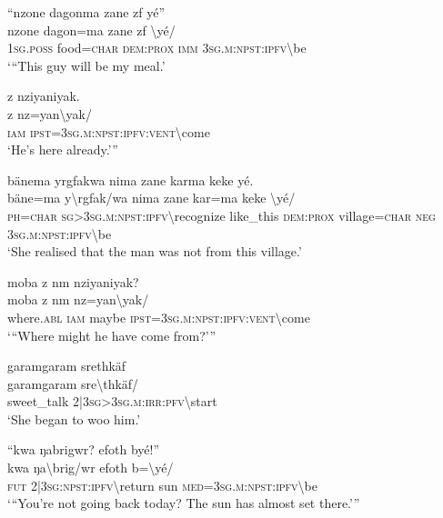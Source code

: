\ea\label{ex:7:a4740}
``nzone dagonma zane zf yé''\\
\gll nzone	dagon=ma	zane	zf	{\textbackslash}yé/\\
     1\textsc{sg}.\textsc{poss}	food=\textsc{char}	\textsc{dem}:\textsc{prox}	\textsc{imm}	3\textsc{sg}.\textsc{m}:\textsc{npst}:\textsc{ipfv}{\textbackslash}be\\
\glt `{``}This guy will be my meal.'
\z

\ea\label{ex:7:a4741}
z nziyaniyak.\\
\gll z	nz=yan{\textbackslash}yak/\\
     \textsc{iam}	\textsc{ipst}=3\textsc{sg}.\textsc{m}:\textsc{npst}:\textsc{ipfv}:\textsc{vent}{\textbackslash}come\\
\glt `He's here already.'''
\z

\ea\label{ex:7:a4742}
bänema yrgfakwa nima zane karma keke yé.\\
\gll bäne=ma	y{\textbackslash}rgfak/wa	nima	zane	kar=ma	keke	{\textbackslash}yé/\\
     \textsc{ph}=\textsc{char}	\textsc{sg}>3\textsc{sg}.\textsc{m}:\textsc{npst}:\textsc{ipfv}{\textbackslash}recognize	like\_this	\textsc{dem}:\textsc{prox}	village=\textsc{char}	\textsc{neg}	3\textsc{sg}.\textsc{m}:\textsc{npst}:\textsc{ipfv}{\textbackslash}be\\
\glt `She realised that the man was not from this village.'
\z

\ea\label{ex:7:a4743}
moba z nm nziyaniyak?\\
\gll moba	z	nm	nz=yan{\textbackslash}yak/\\
     where.\textsc{abl}	\textsc{iam}	maybe	\textsc{ipst}=3\textsc{sg}.\textsc{m}:\textsc{npst}:\textsc{ipfv}:\textsc{vent}{\textbackslash}come\\
\glt `{``}Where might he have come from?'''
\z

\ea\label{ex:7:a4744}
garamgaram srethkäf\\
\gll garamgaram	sre{\textbackslash}thkäf/\\
     sweet\_talk	2|3\textsc{sg}>3\textsc{sg}.\textsc{m}:\textsc{irr}:\textsc{pfv}{\textbackslash}start\\
\glt `She began to woo him.'
\z

\ea\label{ex:7:a4745}
``kwa ŋabrigwr? efoth byé!''\\
\gll kwa	ŋa{\textbackslash}brig/wr	efoth	b={\textbackslash}yé/\\
     \textsc{fut}	2|3\textsc{sg}:\textsc{npst}:\textsc{ipfv}{\textbackslash}return	sun	\textsc{med}=3\textsc{sg}.\textsc{m}:\textsc{npst}:\textsc{ipfv}{\textbackslash}be\\
\glt `{``}You're not going back today? The sun has almost set there.'''
\z

